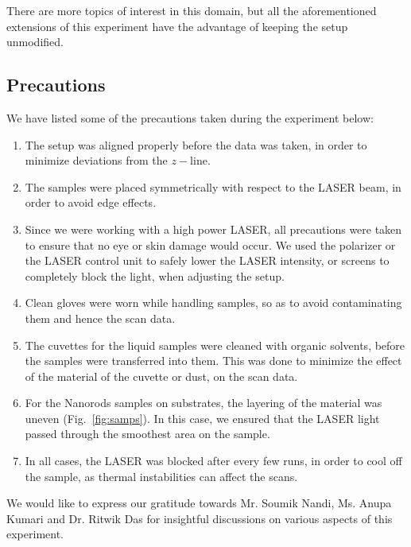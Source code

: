 \documentclass[%
 reprint,
amsmath,
amssymb,
10pt
]{revtex4-2}
\begin{document}
There are more topics of interest in this domain, but all the aforementioned extensions of this experiment have the advantage of keeping the setup unmodified.

\subsection{\label{precautions}Precautions}
We have listed some of the precautions taken during the experiment below:
\begin{enumerate}
    \item The setup was aligned properly before the data was taken, in order to minimize deviations from the $z-$line.
    \item The samples were placed symmetrically with respect to the LASER beam, in order to avoid edge effects.
    \item Since we were working with a high power LASER, all precautions were taken to ensure that no eye or skin damage would occur. We used the polarizer or the LASER control unit to safely lower the LASER intensity, or screens to completely block the light, when adjusting the setup.
    \item Clean gloves were worn while handling samples, so as to avoid contaminating them and hence the scan data.
    \item The cuvettes for the liquid samples were cleaned with organic solvents, before the samples were transferred into them. This was done to minimize the effect of the material of the cuvette or dust, on the scan data.
    \item For the Nanorods samples on substrates, the layering of the material was uneven (Fig.~\ref{fig:samps}). In this case, we ensured that the LASER light passed through the smoothest area on the sample.
    \item In all cases, the LASER was blocked after every few runs, in order to cool off the sample, as thermal instabilities can affect the scans.
\end{enumerate}

\begin{acknowledgments}
We would like to express our gratitude towards Mr. Soumik Nandi, Ms. Anupa Kumari and Dr. Ritwik Das for insightful discussions on various aspects of this experiment.
\end{acknowledgments}


\pagebreak
\newpage
\onecolumngrid
\appendix
\newpage
\end{document}
